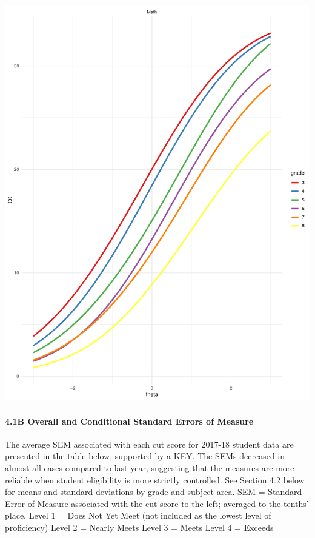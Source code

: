 \documentclass[]{article}
\let\oldparagraph\paragraph
\renewcommand{\paragraph}[1]{\oldparagraph{#1}\mbox{}}
\begin{document}
\includegraphics{tccs/019MathTCC.pdf} \clearpage

\hypertarget{b-overall-and-conditional-standard-errors-of-measure}{%
\paragraph{4.1B Overall and Conditional Standard Errors of
Measure}\label{b-overall-and-conditional-standard-errors-of-measure}}

The average SEM associated with each cut score for 2017-18 student data
are presented in the table below, supported by a KEY. The SEMs decreased
in almost all cases compared to last year, suggesting that the measures
are more reliable when student eligibility is more strictly controlled.
See Section 4.2 below for means and standard deviations by grade and
subject area. SEM = Standard Error of Measure associated with the cut
score to the left; averaged to the tenths' place. Level 1 = Does Not Yet
Meet (not included as the lowest level of proficiency) Level 2 = Nearly
Meets Level 3 = Meets Level 4 = Exceeds
\end{document}
